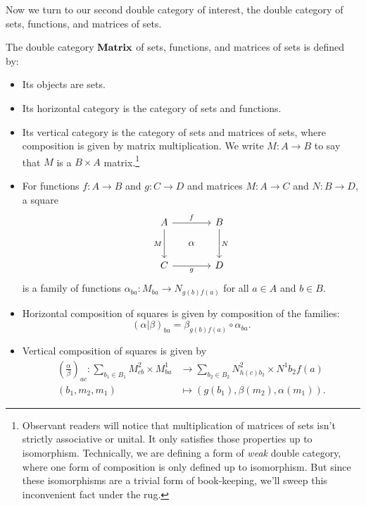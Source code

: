\documentclass[DynamicalBook]{subfiles}
\begin{document}
Now we turn to our second double category of interest, the double category of
sets, functions, and matrices of sets.
\begin{definition}\label{def.double_cat_of_matrices}
  The double category $\textbf{Matrix}$ of sets, functions, and matrices of sets
  is defined by:
  \begin{itemize}
    \item Its objects are sets.
    \item Its horizontal category is the category of sets and functions.
    \item Its vertical category is the category of sets and matrices of sets,
      where composition is given by matrix multiplication. We write $M : A
      \to B$ to say that $M$ is a $B \times A$ matrix.\footnote{Observant
        readers will notice that multiplication of matrices of sets isn't
        strictly associative or unital. It only satisfies those properties up to
      isomorphism. Technically, we are defining a form of \emph{weak} double
      category, where one form of composition is only defined up to isomorphism.
    But since these isomorphisms are a trivial form of book-keeping, we'll sweep
    this inconvenient fact under the rug.}
     \item For functions $f : A \to B$ and $g : C \to D$ and matrices $M : A
       \to C$ and $N : B \to D$, a square
       \[
        \begin{tikzcd}[sep=small]
          A \ar[dd, "M"'] \ar[rr, "f"] & & B \ar[dd, "N"] \\
           & \alpha & \\
          C \ar[rr, "g"'] & & D
        \end{tikzcd}
       \]
       is a family of functions $\alpha_{ba} : M_{ba} \to N_{g(b)f(a)}$ for all
       $a \in A$ and $b \in B$.
     \item Horizontal composition of squares is given by composition of the
       families:
       $$(\alpha | \beta)_{ba} = \beta_{g(b)f(a)} \circ \alpha_{ba}.$$
     \item Vertical composition of squares is given by
       \begin{align*}
         \left( \frac{\alpha}{\beta} \right)_{ac} : \sum_{b_1 \in B_1} M^2_{cb} \times M^1_{ba} &\to \sum_{b_2 \in B_2} N^2_{h(c)b_2} \times N^1{b_2f(a)} \\
         (b_1, m_2, m_1) &\mapsto (g(b_1), \beta(m_2), \alpha(m_1)).
       \end{align*}
  \end{itemize}
\end{definition}
\end{document}
